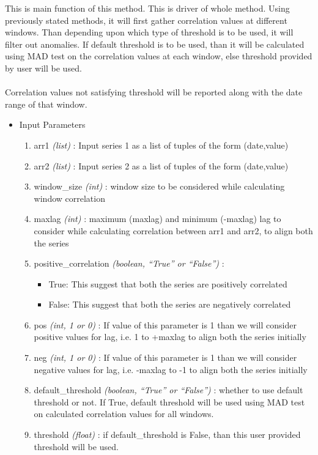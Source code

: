 This is main function of this method. This is driver of whole method. Using 
previously stated methods, it will first gather correlation values at different 
windows. Than depending upon which type of threshold is to be used, it will 
filter out anomalies. If default threshold is to be used, than it will be 
calculated using MAD test on the correlation values at each window, else 
threshold provided by user will be used. \\
\\
Correlation values not satisfying threshold will be reported along with the date 
range of that window.\\


\begin{itemize}
 \item Input Parameters
 
 \begin{enumerate}
  \item arr1 \textit{(list)} : Input series 1 as a list of tuples of the form 
(date,value)
  \item arr2 \textit{(list)} : Input series 2 as a list of tuples of the form 
(date,value)
  \item window\_size \textit{(int)} : window size to be considered while 
calculating window correlation
  \item maxlag \textit{(int)} : maximum (maxlag) and minimum (-maxlag) lag to 
consider while calculating correlation between arr1 and arr2, to align both the 
series
  \item positive\_correlation \textit{(boolean, ``True'' or ``False'')} : 
      \begin{itemize}
       \item True: This suggest that both the series are positively correlated
       \item False: This suggest that both the series are negatively correlated
      \end{itemize}
      
  \item pos \textit{(int, 1 or 0)} : If value of this parameter is 1 than we 
will consider positive values for lag, i.e. 1 to +maxlag to align both the 
series initially
  \item neg \textit{(int, 1 or 0)} : If value of this parameter is 1 than we 
will consider negative values for lag, i.e. -maxlag to -1 to align both the 
series initially
  \item default\_threshold \textit{(boolean, ``True'' or ``False'')} : whether 
to use default threshold or not. If True, default threshold will be used using 
MAD test on calculated correlation values for all windows.
  \item threshold \textit{(float)} : if default\_threshold is False, than this 
user provided threshold will be used.
 \end{enumerate}


\end{itemize}
